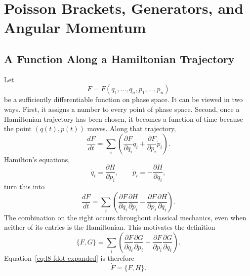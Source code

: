 \chapter{Poisson Brackets, Generators, and Angular Momentum}


\section{A Function Along a Hamiltonian Trajectory}

Let
\[
  F=F(q_1,\ldots,q_n,p_1,\ldots,p_n)
\]
be a sufficiently differentiable function on phase space.  It can be viewed
in two ways.  First, it assigns a number to every point of phase space.
Second, once a Hamiltonian trajectory has been chosen, it becomes a function
of time because the point \((q(t),p(t))\) moves.  Along that trajectory,
\begin{equation}
  \frac{dF}{dt}
  =
  \sum_i\left(
    \frac{\partial F}{\partial q_i}\dot q_i
    +\frac{\partial F}{\partial p_i}\dot p_i
  \right).
  \label{eq:l8-chain-rule}
\end{equation}
Hamilton's equations,
\begin{equation}
  \dot q_i=\frac{\partial H}{\partial p_i},
  \qquad
  \dot p_i=-\frac{\partial H}{\partial q_i},
  \label{eq:l8-hamilton-equations}
\end{equation}
turn this into
\begin{equation}
  \frac{dF}{dt}
  =
  \sum_i\left(
    \frac{\partial F}{\partial q_i}
    \frac{\partial H}{\partial p_i}
    -
    \frac{\partial F}{\partial p_i}
    \frac{\partial H}{\partial q_i}
  \right).
  \label{eq:l8-fdot-expanded}
\end{equation}
The combination on the right occurs throughout classical mechanics, even when
neither of its entries is the Hamiltonian.  This motivates the definition
\begin{equation}
  \boxed{
  \{F,G\}
  =
  \sum_i\left(
    \frac{\partial F}{\partial q_i}
    \frac{\partial G}{\partial p_i}
    -
    \frac{\partial F}{\partial p_i}
    \frac{\partial G}{\partial q_i}
  \right).}
  \label{eq:l8-poisson-definition}
\end{equation}
Equation~\eqref{eq:l8-fdot-expanded} is therefore
\begin{equation}
  \boxed{\dot F=\{F,H\}.}
  \label{eq:l8-time-generator}
\end{equation}

